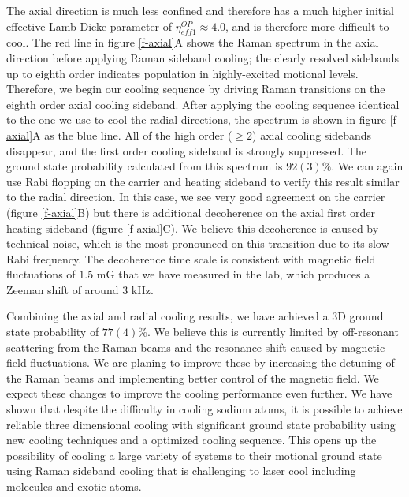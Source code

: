 \documentclass[aps,prl,twocolumn,groupedaddress]{revtex4-1}
\begin{document}
The axial direction is much less confined and therefore has a much higher initial effective
Lamb-Dicke parameter of $\eta^{OP}_{eff1}\approx 4.0$, and is therefore more difficult to cool.
The red line in figure \ref{f-axial}A shows the Raman spectrum in the axial direction
before applying Raman sideband cooling; the clearly resolved sidebands
up to eighth order indicates population in highly-excited motional levels.
Therefore, we begin our cooling sequence by driving Raman transitions on the eighth order axial
cooling sideband. After applying the cooling sequence identical to the one we use to cool
the radial directions, the spectrum is shown in figure \ref{f-axial}A as the blue line.
All of the high order ($\geqslant2$) axial cooling sidebands disappear, and the first order
cooling sideband is strongly suppressed.
The ground state probability calculated from this spectrum is $92(3)\%$.
We can again use Rabi flopping on the carrier and heating sideband to verify this result
similar to the radial direction. In this case, we see very good agreement on the carrier
(figure \ref{f-axial}B) but there is additional decoherence on the axial first order
heating sideband (figure \ref{f-axial}C).
We believe this decoherence is caused by technical noise, which is the most pronounced
on this transition due to its slow Rabi frequency.
The decoherence time scale is consistent with magnetic field fluctuations of $1.5$ mG that we have measured in the lab, which produces
a Zeeman shift of around $3$ kHz.

Combining the axial and radial cooling results,
we have achieved a 3D ground state probability of $77(4)\%$.
We believe this is currently limited by off-resonant scattering from the Raman beams
and the resonance shift caused by magnetic field fluctuations.
We are planing to improve these by increasing the detuning of the Raman beams
and implementing better control of the magnetic field.
We expect these changes to improve the cooling performance even further.
We have shown that despite the difficulty in cooling sodium atoms,
it is possible to achieve reliable three dimensional cooling with significant ground state
probability using new cooling techniques and a optimized cooling sequence.
This opens up the possibility of cooling a large variety of systems to their motional ground
state using Raman sideband cooling that is challenging to laser cool
including molecules and exotic atoms.



\end{document}
